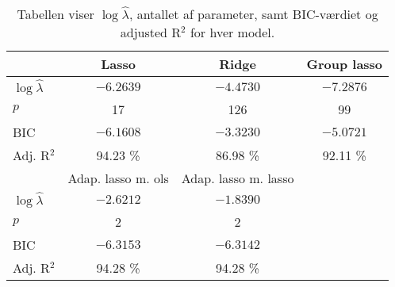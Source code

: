 \begin{table}
\center
\begin{tabular}{lccc} 
\toprule
& \multicolumn{1}{c}{Lasso} & \multicolumn{1}{c}{Ridge}  &  \multicolumn{1}{c}{Group lasso}\\ \midrule
$\log \widehat{\lambda}$ & $-6.2639$ & $-4.4730$  & $-7.2876$ \\
$p$ & 17 & 126 & 99 \\
BIC & $-6.1608 $& $-3.3230$ & $-5.0721$  \\
Adj. R$^2$ & 94.23 \% & 86.98  \%   & 92.11 \%  \\ \bottomrule \toprule
& Adap. lasso m. ols & Adap. lasso m. lasso \\ \midrule
$\log \widehat{\lambda}$ &  $-2.6212$& $-1.8390$ \\
$p$ & 2&2 \\
BIC &  $-6.3153$&$-6.3142$ \\
Adj. R$^2$ & 94.28 \% &  94.28 \% \\ \bottomrule
 \end{tabular}
\caption{Tabellen viser ${\log \widehat\lambda}$, antallet af parameter, samt BIC-værdiet og adjusted R$^2$ for hver model.} \label{tab:bic_lambda}
\end{table}
